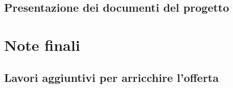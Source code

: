 \documentclass[hidelinks,12pt,a4paper]{article}
\begin{document}
\begin{flushleft}
			\subsection{Presentazione dei documenti del progetto}
		
		\section{Note finali}
			\subsection{Lavori aggiuntivi per arricchire l'offerta}
		
	\end{flushleft}
\end{document}

